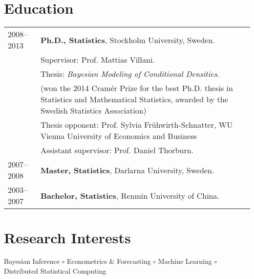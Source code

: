 \documentclass[twoside,a4paper]{article}
\begin{document}
\section*{Education}

\begin{tabular}{ l  p{} l}
  2008--2013 & \textbf{Ph.D., Statistics}, Stockholm University, Sweden. \\
             & Supervisor: Prof. Mattias Villani.                        \\

             & Thesis: \emph{Bayesian Modeling of Conditional Densities}. \\
             & (won the 2014 Cramér Prize for the best Ph.D. thesis in Statistics and Mathematical Statistics, awarded by the Swedish Statistics Association) \\
             & Thesis opponent: Prof. Sylvia Frühwirth-Schnatter, WU Vienna University of Economics and Business               \\
             & Assistant supervisor: Prof. Daniel Thorburn.                     \\
  2007--2008 & \textbf{Master, Statistics}, Darlarna
               University, Sweden.                                             \\

 2003--2007 & \textbf{Bachelor, Statistics}, Renmin University of China. \\
\end{tabular}

\section*{Research Interests}

Bayesian Inference $\circ$ Econometrics \& Forecasting $\circ$ Machine Learning $\circ$ Distributed Statistical Computing
\end{document}
